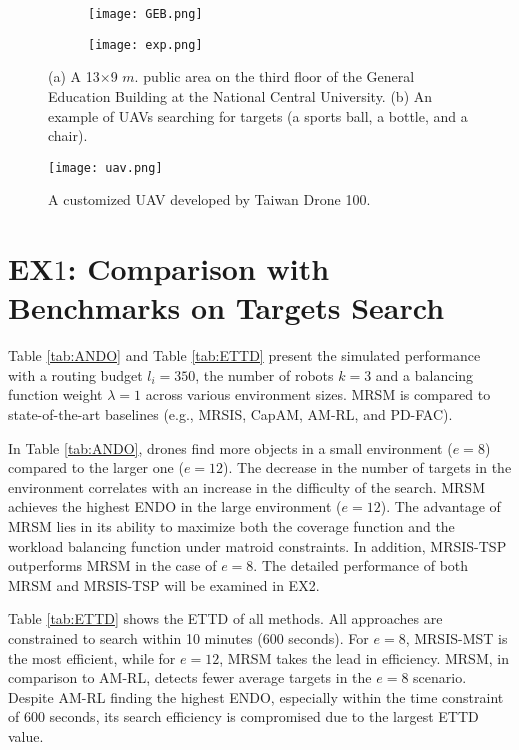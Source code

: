 \begin{figure}
    \centering
    \begin{subfigure}[b]{0.5\textwidth}
        \texttt{[image: GEB.png]}
        \caption{} \label{GEB map}
    \end{subfigure}
    \begin{subfigure}[b]{0.5\textwidth}
    \centering
        \texttt{[image: exp.png]}
        \caption{} \label{GEB exp}
    \end{subfigure}
    \hfill
    \caption{(a) A 13$\times$9 $m.$ public area on the third floor of the General Education Building at the National Central University. (b) An example of UAVs searching for targets (a sports ball, a bottle, and a chair).
    }
    \label{GEB_fig}
\end{figure}

\begin{figure}[htbp]
\centerline{\texttt{[image: uav.png]}}
\caption{A customized UAV developed by Taiwan Drone 100.}
\label{drone}
\end{figure}

\section{EX$1$: Comparison with Benchmarks on Targets Search}
Table \ref{tab:ANDO} and Table \ref{tab:ETTD} present the simulated performance with a routing budget $l_i=350$, the number of robots $k=3$ and a balancing function weight $\lambda=1$ across various environment sizes.
MRSM is compared to state-of-the-art baselines (e.g., MRSIS\cite{li2024mrsis}, CapAM\cite{paull2022learning}, AM-RL\cite{kool2018attention}, and PD-FAC\cite{sheng2022pd}).

In Table \ref{tab:ANDO}, drones find more objects in a small environment ($e=8$) compared to the larger one ($e=12$).
The decrease in the number of targets in the environment correlates with an increase in the difficulty of the search.
MRSM achieves the highest ENDO in the large environment ($e=12$).
The advantage of MRSM lies in its ability to maximize both the coverage function and the workload balancing function under matroid constraints.
In addition, MRSIS-TSP outperforms MRSM in the case of $e=8$. The detailed performance of both MRSM and MRSIS-TSP\cite{li2024mrsis} will be examined in EX2.

Table \ref{tab:ETTD} shows the ETTD of all methods.
All approaches are constrained to search within 10 minutes (600 seconds).
For $e=8$, MRSIS-MST\cite{li2024mrsis} is the most efficient, while for $e=12$, MRSM takes the lead in efficiency.
MRSM, in comparison to AM-RL\cite{kool2018attention}, detects fewer average targets in the $e=8$ scenario.
Despite AM-RL\cite{kool2018attention} finding the highest ENDO, especially within the time constraint of 600 seconds, its search efficiency is compromised due to the largest ETTD value.

